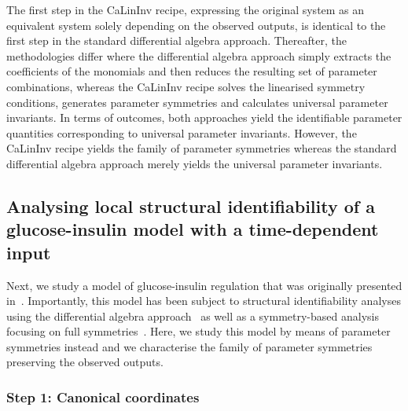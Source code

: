 \documentclass[12pt]{article}
\begin{document}
{The first step in the CaLinInv recipe, expressing the original system as an equivalent system solely depending on the observed outputs, is identical to the first step in the standard differential algebra approach. Thereafter, the methodologies differ where the differential algebra approach simply extracts the coefficients of the monomials and then reduces the resulting set of parameter combinations, whereas the CaLinInv recipe solves the linearised symmetry conditions, generates parameter symmetries and calculates universal parameter invariants.  In terms of outcomes, both approaches yield the identifiable parameter quantities corresponding to universal parameter invariants. However, the CaLinInv recipe yields the family of parameter symmetries whereas the standard differential algebra approach merely yields the universal parameter invariants. 


\subsection{Analysing local structural identifiability of a glucose-insulin model with a time-dependent input}

Next, we study a model of glucose-insulin regulation that was originally presented in~\cite{bolie1961coefficients}. Importantly, this model has been subject to structural identifiability analyses using the differential algebra approach~\cite{cobelli1980parameter} as well as a symmetry-based analysis focusing on full symmetries~\cite{massonis2020finding}. Here, we study this model by means of parameter symmetries instead and we characterise the family of parameter symmetries preserving the observed outputs. 


\subsubsection*{Step 1: Canonical coordinates}

}
\end{document}
